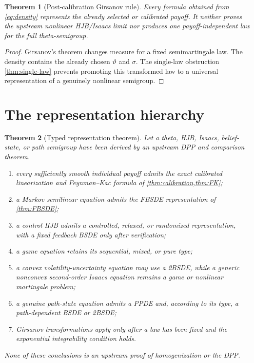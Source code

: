 \documentclass[11pt,reqno]{amsart}
\newtheorem{theorem}{Theorem}[section]
\theoremstyle{definition}
\theoremstyle{remark}
\begin{document}
\begin{theorem}[Post-calibration Girsanov rule]\label{thm:girsanov}
Every formula obtained from \eqref{eq:density} represents the already selected
or calibrated payoff.  It neither proves the upstream nonlinear HJB/Isaacs
limit nor produces one payoff-independent law for the full theta-semigroup.
\end{theorem}

\begin{proof}
Girsanov's theorem changes measure for a fixed semimartingale law.  The density
contains the already chosen $\vartheta$ and $\sigma$.  The single-law
obstruction \cref{thm:single-law} prevents promoting this transformed law to a
universal representation of a genuinely nonlinear semigroup.
\end{proof}

\section{The representation hierarchy}\label{sec:hierarchy}

\begin{theorem}[Typed representation theorem]\label{thm:hierarchy}
Let a theta, HJB, Isaacs, belief-state, or path semigroup have been derived by
an upstream DPP and comparison theorem.
\begin{enumerate}[label=\textup{(\roman*)}]
\item every sufficiently smooth individual payoff admits the exact calibrated
linearization and Feynman--Kac formula of \cref{thm:calibration,thm:FK};
\item a Markov semilinear equation admits the FBSDE representation of
\cref{thm:FBSDE};
\item a control HJB admits a controlled, relaxed, or randomized representation,
with a fixed feedback BSDE only after verification;
\item a game equation retains its sequential, mixed, or pure type;
\item a convex volatility-uncertainty equation may use a 2BSDE, while a generic
nonconvex second-order Isaacs equation remains a game or nonlinear martingale
problem;
\item a genuine path-state equation admits a PPDE and, according to its type, a
path-dependent BSDE or 2BSDE;
\item Girsanov transformations apply only after a law has been fixed and the
exponential integrability condition holds.
\end{enumerate}
None of these conclusions is an upstream proof of homogenization or the DPP.
\end{theorem}
\end{document}
